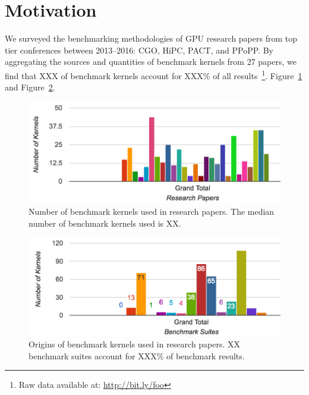 \documentclass[preprint,nonatbib,10pt,nocopyrightspace]{sigplanconf}
\begin{document}
\section{Motivation}\label{sec:motivation}

We surveyed the benchmarking methodologies of GPU research papers from
top tier conferences between 2013--2016: CGO, HiPC, PACT, and
PPoPP. By aggregating the sources and quantities of benchmark kernels
from 27 papers, we find that XXX of benchmark kernels account for
XXX\% of all results~\footnote{Raw data available at:
  \url{http://bit.ly/foo}}. Figure~\ref{fig:benchmark-quantity-distribution}
and Figure~\ref{fig:benchmark-suite-distribution}.


\begin{figure}[t]
  \includegraphics[width=\columnwidth]{img/benchmark-quantitiy-distribution}
  \caption{%
    Number of benchmark kernels used in research papers. The median
    number of benchmark kernels used is XX.%
  }
  \label{fig:benchmark-quantity-distribution}
\end{figure}

\begin{figure}[t]
  \includegraphics[width=\columnwidth]{img/benchmark-suite-distribution}
  \caption{%
    Origins of benchmark kernels used in research papers. XX benchmark
    suites account for XXX\% of benchmark results.%
  }
  \label{fig:benchmark-suite-distribution}
\end{figure}
\end{document}
